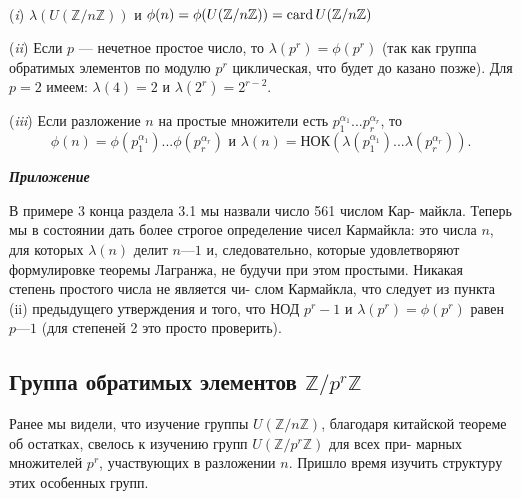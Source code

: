 \begin{property}
\
 
\par  (\textit{i}) $\lambda(U(\mathbb{Z}/n\mathbb{Z}))$ и $\phi(n)=\phi(U(\mathbb{Z}/n\mathbb{Z}))=\operatorname{card} U(\mathbb{Z}/n\mathbb{Z})$
\par  (\textit{ii}) Если $p$ — нечетное простое число, то $\lambda(p^r) = \phi(p^r)$ (так как
группа обратимых элементов по модулю $p^r$ циклическая, что будет до­
казано позже). Для $p = 2$ имеем: $\lambda(4) = 2$ и $\lambda(2^r) = 2^{r - 2}$.
\par  (\textit{iii}) Если разложение $n$ на простые множители есть $p_1^{\alpha_1}...p_r^{\alpha_r}$, то
$$\phi(n)=\phi(p_1^{\alpha_1})...\phi(p_r^{\alpha_r}) \text{ и } \lambda(n)=\text{НОК}(\lambda(p_1^{\alpha_1})...\lambda(p_r^{\alpha_r})).$$

\end{property}
\begin{beznomera}
\textbf{\textit{Приложение}}

В примере 3 конца раздела 3.1 мы назвали число 561 числом Кар­-\linebreak
майкла. Теперь мы в состоянии дать более строгое определение чисел\linebreak
Кармайкла: это числа $n$, для которых $\lambda(n)$ делит $n — 1$ и, следовательно,\linebreak
которые удовлетворяют формулировке теоремы Лагранжа, не будучи\linebreak
при этом простыми. Никакая степень простого числа не является чи­-\linebreak
слом Кармайкла, что следует из пункта (ii) предыдущего утверждения\linebreak
и того, что НОД $p^r - 1$ и $\lambda(p^r)=\phi(p^r)$ равен $p — 1$ (для степеней 2 это\linebreak
просто проверить).
\end{beznomera}
\newpage
\subsection{Группа обратимых элементов $\mathbb{Z}/p^r\mathbb{Z}$}
\noindent Ранее мы видели, что изучение группы $U(\mathbb{Z}/n\mathbb{Z})$, благодаря китайской\linebreak
теореме об остатках, свелось к изучению групп $U(\mathbb{Z}/p^r\mathbb{Z})$ для всех при-\linebreak
марных множителей $p^r$, участвующих в разложении $n$. Пришло время\linebreak
изучить структуру этих особенных групп.

